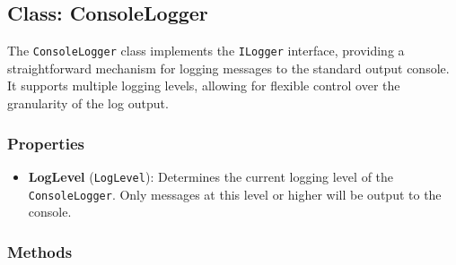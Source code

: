 \documentclass[12pt]{article}
\begin{document}
\subsection*{Class: ConsoleLogger}

The \texttt{ConsoleLogger} class implements the \texttt{ILogger} interface, providing a straightforward mechanism for logging messages to the standard output console. It supports multiple logging levels, allowing for flexible control over the granularity of the log output.

\subsubsection*{Properties}

\begin{itemize}
    \item \textbf{LogLevel} (\texttt{LogLevel}): Determines the current logging level of the \texttt{ConsoleLogger}. Only messages at this level or higher will be output to the console.
\end{itemize}

\subsubsection*{Methods}
\end{document}

